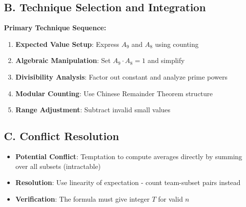 \documentclass[]{article}
\begin{document}
\begin{techniquesbox}
		\subsection*{B. Technique Selection and Integration}
		
		\textbf{Primary Technique Sequence:}
		\begin{enumerate}
			\item \textbf{Expected Value Setup}: Express $A_9$ and $A_8$ using counting
			\item \textbf{Algebraic Manipulation}: Set $A_9 \cdot A_8 = 1$ and simplify
			\item \textbf{Divisibility Analysis}: Factor out constant and analyze prime powers
			\item \textbf{Modular Counting}: Use Chinese Remainder Theorem structure
			\item \textbf{Range Adjustment}: Subtract invalid small values
		\end{enumerate}
		
		\subsection*{C. Conflict Resolution}
		\begin{itemize}[leftmargin=*]
			\item \textbf{Potential Conflict}: Temptation to compute averages directly by summing over all subsets (intractable)
			\item \textbf{Resolution}: Use linearity of expectation - count team-subset pairs instead
			\item \textbf{Verification}: The formula must give integer $T$ for valid $n$
		\end{itemize}
	\end{techniquesbox}
	
\end{document}
